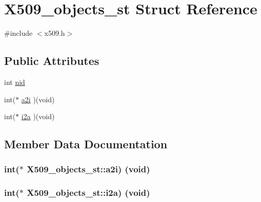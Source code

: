 \hypertarget{struct_x509__objects__st}{}\section{X509\+\_\+objects\+\_\+st Struct Reference}
\label{struct_x509__objects__st}


{\ttfamily \#include $<$x509.\+h$>$}

\subsection*{Public Attributes}
\begin{DoxyCompactItemize}
\item 
int \hyperlink{struct_x509__objects__st_a8f3f79c1037e355813b601c2c9c4d019}{nid}
\item 
int($\ast$ \hyperlink{struct_x509__objects__st_a6b2bfa8ee8cf1a8acc1add5d1f3940ef}{a2i} )(void)
\item 
int($\ast$ \hyperlink{struct_x509__objects__st_a7e32841a9585320493acee913eb32ae6}{i2a} )(void)
\end{DoxyCompactItemize}


\subsection{Member Data Documentation}
\subsubsection[{\texorpdfstring{a2i}{a2i}}]{\setlength{\rightskip}{0pt plus 5cm}int($\ast$ X509\+\_\+objects\+\_\+st\+::a2i) (void)}\hypertarget{struct_x509__objects__st_a6b2bfa8ee8cf1a8acc1add5d1f3940ef}{}\label{struct_x509__objects__st_a6b2bfa8ee8cf1a8acc1add5d1f3940ef}
\subsubsection[{\texorpdfstring{i2a}{i2a}}]{\setlength{\rightskip}{0pt plus 5cm}int($\ast$ X509\+\_\+objects\+\_\+st\+::i2a) (void)}\hypertarget{struct_x509__objects__st_a7e32841a9585320493acee913eb32ae6}{}\label{struct_x509__objects__st_a7e32841a9585320493acee913eb32ae6}
